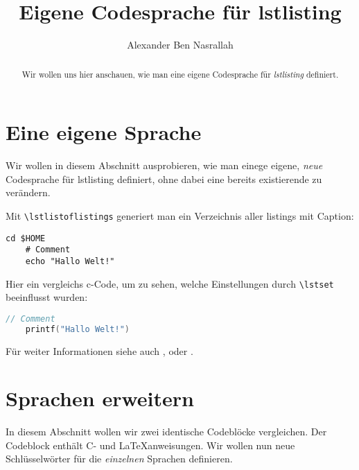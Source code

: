 \documentclass[a4paper]{article}
\title{Eigene Codesprache für lstlisting}
\author{Alexander Ben Nasrallah}
\begin{document}
\maketitle
\begin{abstract}
	Wir wollen uns hier anschauen, wie man eine eigene Codesprache für
	\emph{lstlisting} definiert.
\end{abstract}

\section{Eine eigene Sprache}
Wir wollen in diesem Abschnitt ausprobieren, wie man einege eigene, \emph{neue}
Codesprache für lstlisting definiert, ohne dabei eine bereits existierende zu
verändern.

Mit \verb+\lstlistoflistings+ generiert man ein Verzeichnis aller listings mit
Caption:
\lstlistoflistings

\begin{lstlisting}[language=cli, title=Titel, caption={Command line}]
	cd $HOME
	# Comment
	echo "Hallo Welt!"
\end{lstlisting}

Hier ein vergleichs c-Code, um zu sehen, welche Einstellungen durch
\verb+\lstset+ beeinflusst wurden:
\begin{lstlisting}[language=C, caption={c-Code mit Standardeinstellungen}]
	// Comment
	printf("Hallo Welt!")
\end{lstlisting}

Für weiter Informationen siehe auch \cite{ctanListings}, \cite{wikiListings} oder \cite{manListings}.

\section{Sprachen erweitern}
In diesem Abschnitt wollen wir zwei identische Codeblöcke vergleichen. Der
Codeblock enthält C- und \LaTeX{}anweisungen. Wir wollen nun neue
Schlüsselwörter für die \emph{einzelnen} Sprachen definieren.

\end{document}
